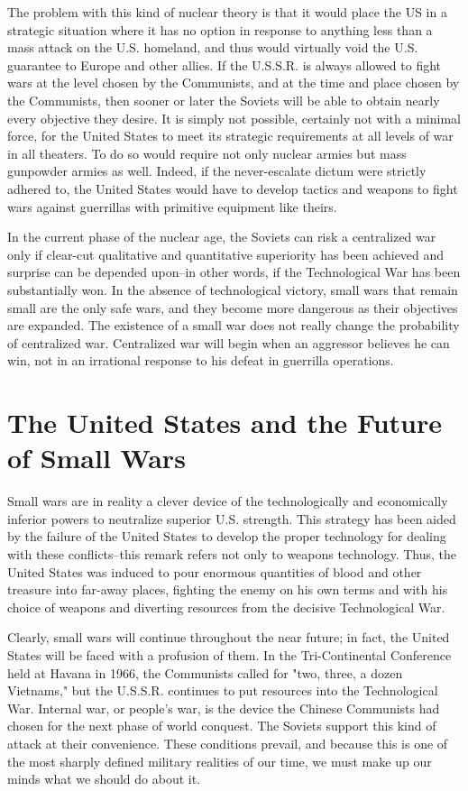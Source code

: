 The problem with this kind of nuclear theory is that it would place the US in a strategic situation where it has no option in response to anything less than a mass attack on the U.S. homeland, and thus would virtually void the U.S. guarantee to Europe and other allies. If the U.S.S.R. is always allowed to fight wars at the level chosen by the Communists, and at the time and place chosen by the Communists, then sooner or later the Soviets will be able to obtain nearly every objective they desire. It is simply not possible, certainly not with a minimal force, for the United States to meet its strategic requirements at all levels of war in all theaters. To do so would require not only nuclear armies but mass gunpowder armies as well. Indeed, if the never-escalate dictum were strictly adhered to, the United States would have to develop tactics and weapons to fight wars against guerrillas with primitive equipment like theirs.

In the current phase of the nuclear age, the Soviets can risk a centralized war only if clear-cut qualitative and quantitative superiority has been achieved and surprise can be depended upon--in other words, if the Technological War has been substantially won. In the absence of technological victory, small wars that remain small are the only safe wars, and they become more dangerous as their objectives are expanded. The existence of a small war does not really change the probability of centralized war. Centralized war will begin when an aggressor believes he can win, not in an irrational response to his defeat in guerrilla operations.

\section{The United States and the Future of Small Wars}
Small wars are in reality a clever device of the technologically and economically inferior powers to neutralize superior U.S. strength. This strategy has been aided by the failure of the United States to develop the proper technology for dealing with these conflicts--this remark refers not only to weapons technology. Thus, the United States was induced to pour enormous quantities of blood and other treasure into far-away places, fighting the enemy on his own terms and with his choice of weapons and diverting resources from the decisive Technological War.

Clearly, small wars will continue throughout the near future; in fact, the United States will be faced with a profusion of them. In the Tri-Continental Conference held at Havana in 1966, the Communists called for "two, three, a dozen Vietnams," but the U.S.S.R. continues to put resources into the Technological War. Internal war, or people's war, is the device the Chinese Communists had chosen for the next phase of world conquest. The Soviets support this kind of attack at their convenience. These conditions prevail, and because this is one of the most sharply defined military realities of our time, we must make up our minds what we should do about it.

